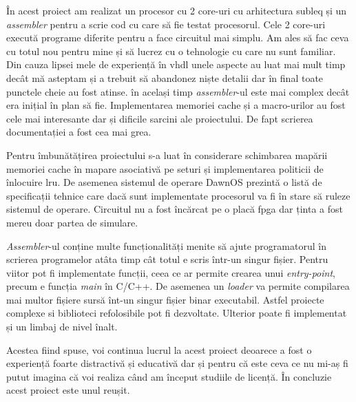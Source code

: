 \documentclass[../main.tex]{subfiles}
\begin{document}
    În acest proiect am realizat un procesor cu 2 core-uri cu arhitectura \acrshort{subleq} și un
    \emph{assembler} pentru a scrie cod cu care să fie testat procesorul. Cele 2 core-uri execută
    programe diferite pentru a face circuitul mai simplu. Am ales să fac ceva cu totul nou pentru
    mine și să lucrez cu o tehnologie cu care nu sunt familiar. Din cauza lipsei mele de experiență
    în \acrshort{vhdl} unele aspecte au luat mai mult timp decât mă asteptam și a trebuit să abandonez
    niște detalii dar în final toate punctele cheie au fost atinse. 
    în același timp \emph{assembler}-ul este mai complex decât era inițial în plan
    să fie. Implementarea memoriei cache și a macro-urilor au fost cele mai interesante dar și
    dificile sarcini ale proiectului. De fapt scrierea documentației a fost cea mai grea.

    Pentru îmbunătățirea proiectului s-a luat în considerare schimbarea mapării memoriei
    cache în mapare asociativă pe seturi și implementarea politicii de înlocuire \acrshort{lru}.
    De asemenea sistemul de operare DawnOS prezintă o listă de specificații tehnice care
    dacă sunt implementate procesorul va fi în stare să ruleze sistemul de operare. Circuitul nu a 
    fost încărcat pe o placă \acrshort{fpga} dar ținta a fost mereu doar partea de simulare.

    \emph{Assembler}-ul conține multe funcționalități menite să ajute programatorul în scrierea
    programelor atâta timp cât totul e scris într-un singur fișier. Pentru viitor pot fi
    implementate funcții, ceea ce ar permite crearea unui \emph{entry-point}, precum e
    funcția \emph{main} în C/C++. De asemenea un \emph{loader} va permite compilarea mai multor
    fișiere sursă înt-un singur fișier binar executabil. Astfel proiecte complexe si biblioteci
    refolosibile pot fi dezvoltate. Ulterior poate fi implementat și un limbaj de nivel
    înalt.

    Acestea fiind spuse, voi continua lucrul la acest proiect deoarece a fost o experiență foarte
    distractivă și educativă dar și pentru că este ceva ce nu mi-aș fi putut imagina că voi
    realiza când am început studiile de licență. În concluzie acest proiect este unul reușit.
\end{document}
